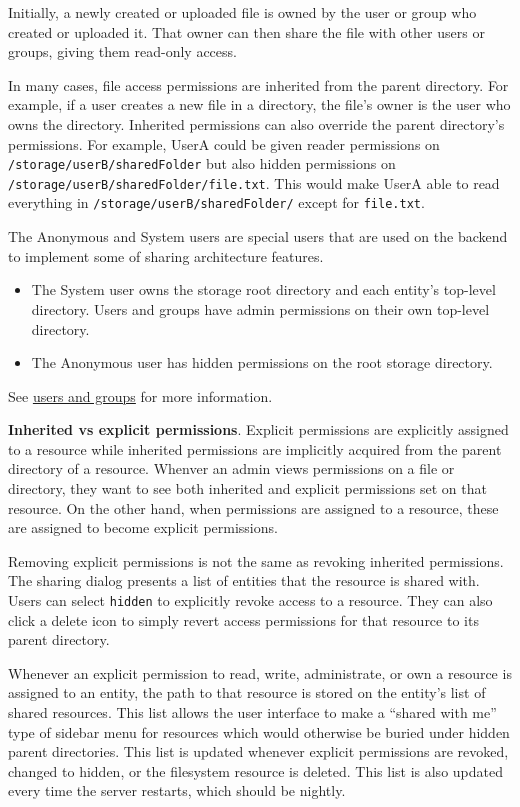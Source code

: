 Initially, a newly created or uploaded file is owned by the user or
group who created or uploaded it. That owner can then share the file
with other users or groups, giving them read-only access.

In many cases, file access permissions are inherited from the parent
directory. For example, if a user creates a new file in a directory, the
file's owner is the user who owns the directory. Inherited permissions
can also override the parent directory's permissions. For example, UserA
could be given reader permissions on
\texttt{/storage/userB/sharedFolder} but also hidden permissions on
\texttt{/storage/userB/sharedFolder/file.txt}. This would make UserA
able to read everything in \texttt{/storage/userB/sharedFolder/} except
for \texttt{file.txt}.

The Anonymous and System users are special users that are used on the
backend to implement some of sharing architecture features.

\begin{itemize}
\tightlist
\item
  The System user owns the storage root directory and each entity's
  top-level directory. Users and groups have admin permissions on their
  own top-level directory.
\item
  The Anonymous user has hidden permissions on the root storage
  directory.
\end{itemize}

See \href{/docs/users_and_groups.md}{users and groups} for more
information.

\textbf{Inherited vs explicit permissions}. Explicit permissions are
explicitly assigned to a resource while inherited permissions are
implicitly acquired from the parent directory of a resource. Whenver an
admin views permissions on a file or directory, they want to see both
inherited and explicit permissions set on that resource. On the other
hand, when permissions are assigned to a resource, these are assigned to
become explicit permissions.

Removing explicit permissions is not the same as revoking inherited
permissions. The sharing dialog presents a list of entities that the
resource is shared with. Users can select \texttt{hidden} to explicitly
revoke access to a resource. They can also click a delete icon to simply
revert access permissions for that resource to its parent directory.

Whenever an explicit permission to read, write, administrate, or own a
resource is assigned to an entity, the path to that resource is stored
on the entity's list of shared resources. This list allows the user
interface to make a ``shared with me'' type of sidebar menu for
resources which would otherwise be buried under hidden parent
directories. This list is updated whenever explicit permissions are
revoked, changed to hidden, or the filesystem resource is deleted. This
list is also updated every time the server restarts, which should be
nightly.

